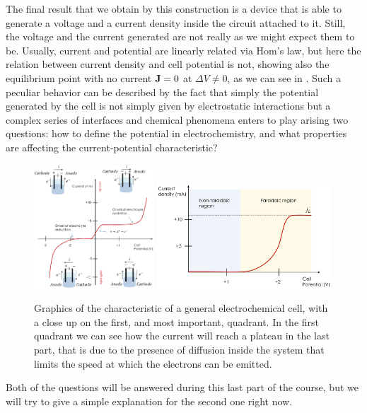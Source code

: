 The final result that we obtain by this construction is a device that is able to generate a voltage and a current density inside the circuit attached to it. Still, the voltage and the current generated are not really as we might expect them to be. Usually, current and potential are linearly related via Hom's law, but here the relation between current density and cell potential is not, showing also the equilibrium point with no current $\vb{J} = 0$ at $\Delta V \neq 0$, as we can see in . Such a peculiar behavior can be described by the fact that simply the potential generated by the cell is not simply given by electrostatic interactions but a complex series of interfaces and chemical phenomena enters to play arising two questions: how to define the potential in electrochemistry, and what properties are affecting the current-potential characteristic?
\begin{figure}[t]
    \centering
    \includegraphics[width=0.4\textwidth]{Immagini/VvsI.png}
    \includegraphics[width=0.58\textwidth]{Immagini/CarRegions.png}
    \caption{
        Graphics of the characteristic of a general electrochemical cell, with a close up on the first, and most important, quadrant. In the first quadrant we can see how the current will reach a plateau in the last part, that is due to the presence of diffusion inside the system that limits the speed at which the electrons can be emitted.
    }
    \label{fig:CellCaracteristic}
\end{figure}
Both of the questions will be answered during this last part of the course, but we will try to give a simple explanation for the second one right now.

